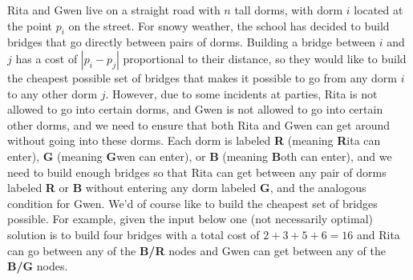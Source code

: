 \documentclass[11pt]{article}
\theoremstyle{definition}
\begin{document}
\begin{enumerate}[leftmargin=0pt, itemsep=3ex]
\problemitem Rita and Gwen live on a straight road with $n$ tall dorms, with dorm $i$ located at the point $p_i$ on the street.  For snowy weather, the school has decided to build bridges that go directly between pairs of dorms.  Building a bridge between $i$ and $j$ has a cost of $|p_i - p_j|$ proportional to their distance, so they would like to build the cheapest possible set of bridges that makes it possible to go from any dorm $i$ to any other dorm $j$.  However, due to some incidents at parties, Rita is not allowed to go into certain dorms, and Gwen is not allowed to go into certain other dorms, and we need to ensure that both Rita and Gwen can get around without going into these dorms.  Each dorm is labeled 
\textbf{R} (meaning \textbf{R}ita can enter), \textbf{G} (meaning \textbf{G}wen can enter), or \textbf{B} (meaning \textbf{B}oth can enter), and we need to build enough bridges so that Rita can get between any pair of dorms labeled \textbf{R} or \textbf{B} without entering any dorm labeled $\textbf{G}$, and the analogous condition for Gwen.  We'd of course like to build the cheapest set of bridges possible.  For example, given the input below one (not necessarily optimal) solution is to build four bridges with a total cost of $2 + 3 + 5 + 6 = 16$ and Rita can go between any of the \textbf{B/R} nodes and Gwen can get between any of the \textbf{B/G} nodes.

\begin{figure}[h!]\begin{center}
\end{center}\end{figure} \vspace{-10pt}


\end{enumerate}
\end{document}
